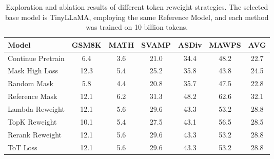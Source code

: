 \begin{table*}[t]
\centering
\small
\caption{Exploration and ablation results of different token reweight strategies. The selected base model is TinyLLaMA, employing the same Reference Model, and each method was trained on 10 billion tokens.}
\label{tab:lossy_ref_result}
\begin{tabular}{l|ccccc|c}
\toprule
\textbf{Model} & \textbf{GSM8K} & \textbf{MATH} & \textbf{SVAMP} & \textbf{ASDiv} & \textbf{MAWPS} & \textbf{AVG} \\
\midrule
Continue Pretrain & 6.4 & 3.6 & 21.0 & 34.4 & 48.2 & 22.7 \\
Mask High Loss & 12.3 & 5.4 & 25.2 & 35.8 & 43.8 & 24.5 \\
Random Mask & 5.8 & 4.4 & 20.8 & 35.7 & 47.5 & 22.8 \\
Reference Mask & 12.1 & 6.2 & 31.3 & 48.2 & 62.6 & 32.1 \\
Lambda Reweight & 12.1 & 5.6 & 29.6 & 43.3 & 53.2 & 28.8 \\
TopK Reweight & 10.1 & 5.4 & 27.5 & 43.1 & 56.5 & 28.5 \\
Rerank Reweight & 12.1 & 5.6 & 29.6 & 43.3 & 53.2 & 28.8 \\
ToT Loss & 12.1 & 5.6 & 29.6 & 43.3 & 53.2 & 28.8 \\
\bottomrule
\end{tabular}
\end{table*}